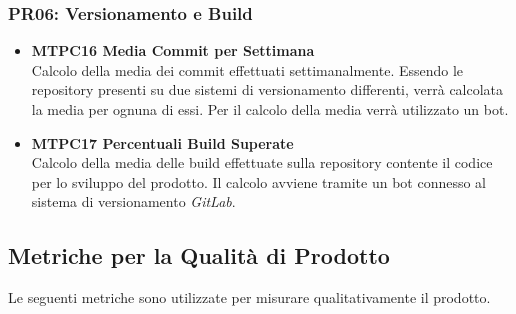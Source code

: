 \subsubsection{PR06: Versionamento e Build}
\begin{itemize}
	\item \textbf{MTPC16 Media Commit per Settimana} ~\\
	Calcolo della media dei commit effettuati settimanalmente. Essendo le repository presenti su due sistemi di versionamento differenti, verrà calcolata la media per ognuna di essi. Per il calcolo della media verrà utilizzato un bot.
	\item \textbf{MTPC17 Percentuali Build Superate} ~\\
	Calcolo della media delle build effettuate sulla repository contente il codice per lo sviluppo del prodotto. Il calcolo avviene tramite un bot connesso al sistema di versionamento \textit{GitLab}. 
\end{itemize}

\subsection{Metriche per la Qualità di Prodotto}
Le seguenti metriche sono utilizzate per misurare qualitativamente il prodotto.

\iffalse
\paragraph{MTTS15 Numero di Test Eseguiti per Requisito}\-\\
\fi

